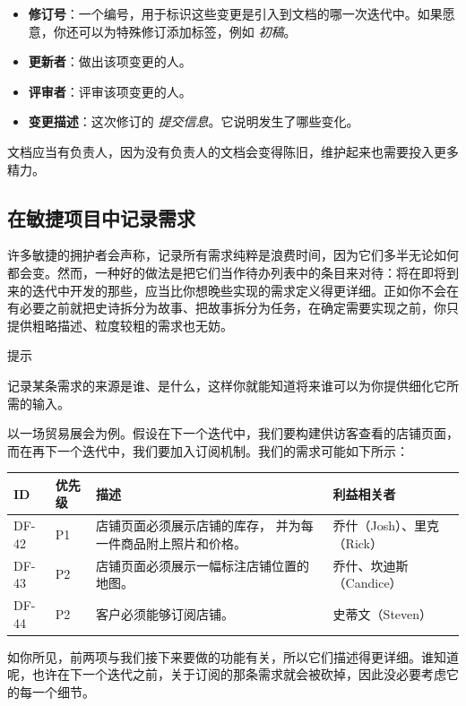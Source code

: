 \begin{itemize}
\item \textbf{修订号}：一个编号，用于标识这些变更是引入到文档的哪一次迭代中。如果愿意，你还可以为特殊修订添加标签，例如 \emph{初稿}。
\item \textbf{更新者}：做出该项变更的人。
\item \textbf{评审者}：评审该项变更的人。
\item \textbf{变更描述}：这次修订的 \emph{提交信息}。它说明发生了哪些变化。
\end{itemize}

文档应当有负责人，因为没有负责人的文档会变得陈旧，维护起来也需要投入更多精力。

\subsection{在敏捷项目中记录需求}

\label{idx:178}
许多敏捷的拥护者会声称，记录所有需求纯粹是浪费时间，因为它们多半无论如何都会变。然而，一种好的做法是把它们当作待办列表中的条目来对待：将在即将到来的迭代中开发的那些，应当比你想晚些实现的需求定义得更详细。正如你不会在有必要之前就把史诗拆分为故事、把故事拆分为任务，在确定需要实现之前，你只提供粗略描述、粒度较粗的需求也无妨。

\begin{myTip}{提示}

记录某条需求的来源是谁、是什么，这样你就能知道将来谁可以为你提供细化它所需的输入。
\end{myTip}

以一场贸易展会为例。假设在下一个迭代中，我们要构建供访客查看的店铺页面，而在再下一个迭代中，我们要加入订阅机制。我们的需求可能如下所示：

\begin{center}
\begin{tabularx}{\textwidth}{XXXX}
\toprule
\textbf{ID} & \textbf{优先级} & \textbf{描述} & \textbf{利益相关者} \\
\midrule
DF-42 & P1 & 店铺页面必须展示店铺的库存， 并为每一件商品附上照片和价格。 & 乔什（Josh）、里克（Rick） \\
DF-43 & P2 & 店铺页面必须展示一幅标注店铺位置的地图。 & 乔什、坎迪斯（Candice） \\
DF-44 & P2 & 客户必须能够订阅店铺。 & 史蒂文（Steven） \\
\bottomrule
\end{tabularx}
\end{center}

如你所见，前两项与我们接下来要做的功能有关，所以它们描述得更详细。谁知道呢，也许在下一个迭代之前，关于订阅的那条需求就会被砍掉，因此没必要考虑它的每一个细节。

